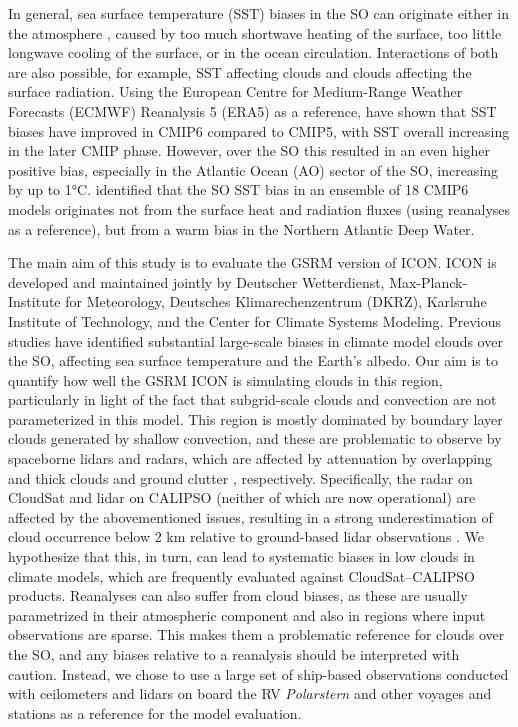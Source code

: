 \documentclass[draft]{agujournal2019}
\begin{document}
In general, sea surface temperature (SST) biases in the SO can originate either in the atmosphere \cite{hyder2018}, caused by too much shortwave heating of the surface, too little longwave cooling of the surface, or in the ocean circulation. Interactions of both are also possible, for example, SST affecting clouds and clouds affecting the surface radiation. Using the European Centre for Medium-Range Weather Forecasts (ECMWF) Reanalysis 5 (ERA5) as a reference,  have shown that SST biases have improved in CMIP6 compared to CMIP5, with SST overall increasing in the later CMIP phase. However, over the SO this resulted in an even higher positive bias, especially in the Atlantic Ocean (AO) sector of the SO, increasing by up to 1°C.  identified that the SO SST bias in an ensemble of 18 CMIP6 models originates not from the surface heat and radiation fluxes (using reanalyses as a reference), but from a warm bias in the Northern Atlantic Deep Water.

The main aim of this study is to evaluate the GSRM version of ICON. ICON is developed and maintained jointly by Deutscher Wetterdienst, Max-Planck-Institute for Meteorology, Deutsches Klimarechenzentrum (DKRZ), Karlsruhe Institute of Technology, and the Center for Climate Systems Modeling. Previous studies have identified substantial large-scale biases in climate model clouds over the SO, affecting sea surface temperature and the Earth’s albedo. Our aim is to quantify how well the GSRM ICON is simulating clouds in this region, particularly in light of the fact that subgrid-scale clouds and convection are not parameterized in this model. This region is mostly dominated by boundary layer clouds generated by shallow convection, and these are problematic to observe by spaceborne lidars and radars, which are affected by attenuation by overlapping and thick clouds \cite{mace2009,medeiros2010} and ground clutter \cite{marchand2008}, respectively. Specifically, the radar on CloudSat and lidar on CALIPSO (neither of which are now operational) are affected by the abovementioned issues, resulting in a strong underestimation of cloud occurrence below 2 km relative to ground-based lidar observations \cite{mcerlich2021}. We hypothesize that this, in turn, can lead to systematic biases in low clouds in climate models, which are frequently evaluated against CloudSat--CALIPSO products. Reanalyses can also suffer from cloud biases, as these are usually parametrized in their atmospheric component and also in regions where input observations are sparse. This makes them a problematic reference for clouds over the SO, and any biases relative to a reanalysis should be interpreted with caution. Instead, we chose to use a large set of ship-based observations conducted with ceilometers and lidars on board the RV \emph{Polarstern} and other voyages and stations as a reference for the model evaluation.
\end{document}
